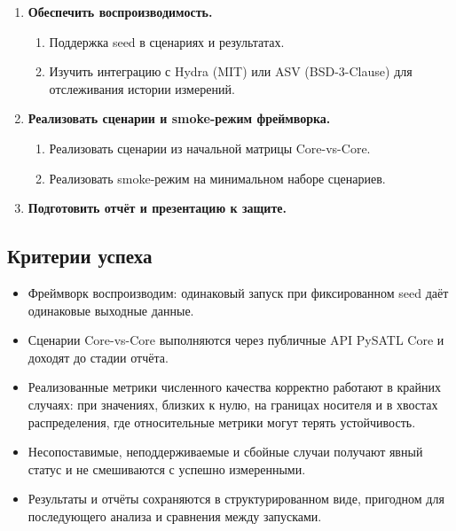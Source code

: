 \documentclass[12pt,a4paper]{article}
\begin{document}
\begin{enumerate}[label=\arabic*., leftmargin=*]
  \item \textbf{Обеспечить воспроизводимость.}
  \begin{enumerate}[label=\arabic{enumi}.\arabic*., leftmargin=*]
    \item Поддержка seed в сценариях и результатах.
    \item Изучить интеграцию с Hydra (MIT) или ASV (BSD-3-Clause)
          для отслеживания истории измерений.
  \end{enumerate}

  \item \textbf{Реализовать сценарии и smoke-режим фреймворка.}
  \begin{enumerate}[label=\arabic{enumi}.\arabic*., leftmargin=*]
    \item Реализовать сценарии из начальной матрицы Core-vs-Core.
    \item Реализовать smoke-режим на минимальном наборе
          сценариев.
  \end{enumerate}

  \item \textbf{Подготовить отчёт и презентацию к защите.}

\end{enumerate}

\subsection*{Критерии успеха}

\begin{itemize}
  \item Фреймворк воспроизводим: одинаковый запуск при фиксированном
        seed даёт одинаковые выходные данные.
  \item Сценарии Core-vs-Core выполняются через публичные API
        PySATL Core и доходят до стадии отчёта.
  \item Реализованные метрики численного качества корректно работают
        в крайних случаях: при значениях, близких к нулю, на границах
        носителя и в хвостах распределения, где относительные метрики
        могут терять устойчивость.
  \item Несопоставимые, неподдерживаемые и сбойные случаи получают
        явный статус и не смешиваются с успешно измеренными.
  \item Результаты и отчёты сохраняются в структурированном виде,
        пригодном для последующего анализа и сравнения между запусками.
\end{itemize}
\end{document}
